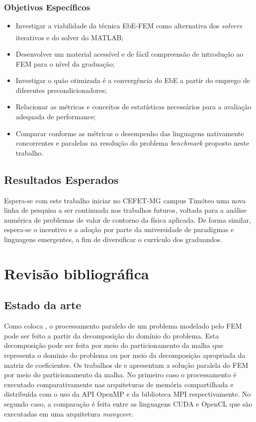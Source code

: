 \documentclass[
    12pt,               %
    openright,          %
    oneside,
    a4paper,            %
    english,            %
    french,             %
    spanish,            %
    brazil              %
    ]{abntex2}
\newcommand{\matlab}{MATLAB\textsuperscript{\textregistered}}
\begin{document}
\subsection{Objetivos Específicos}

	\begin{itemize}
		\item Investigar a viabilidade da técnica EbE-FEM como alternativa dos \textit{solvers} iterativos e do solver do  \matlab;
		\item Desenvolver um material acessível e de fácil compreensão de introdução ao FEM para o nível da graduação;
		\item Investigar o quão otimizada é a convergência do EbE a partir do emprego de diferentes precondicionadores;		
		\item Relacionar as métricas e conceitos de estatísticas necessários para a avaliação adequada de performance;
		\item Comparar conforme as métricas o desempenho das linguagens nativamente concorrentes e paralelas na resolução do problema \textit{benchmark} proposto neste trabalho.
	\end{itemize}

\section{Resultados Esperados}

Espera-se com este trabalho iniciar no CEFET-MG campus Timóteo uma nova linha de pesquisa a ser continuada nos trabalhos futuros, voltada para a análise numérica de problemas de valor de contorno da física aplicada. De forma similar, espera-se o incentivo e a adoção por parte da universidade de paradigmas e linguagens emergentes, a fim de diversificar o currículo dos graduandos.


\chapter{Revisão bibliográfica}
\section{Estado da arte}
Como coloca , o processamento paralelo de um problema modelado pelo FEM pode ser feito a partir da decomposição do domínio do problema. Esta decomposição pode ser feita por meio do particionamento da malha que representa o domínio do problema ou por meio da decomposição apropriada da matriz de coeficientes.
Os trabalhos de  e  apresentam a solução paralela do FEM por meio do particionamento da malha. No primeiro caso o processamento é executado comparativamente nas arquiteturas de memória compartilhada e distribuída com o uso da API OpenMP e da biblioteca MPI respectivamente.
No segundo caso, a comparação é feita entre as linguagens CUDA e OpenCL que são executadas em uma arquitetura \textit{manycore}. 
\end{document}
